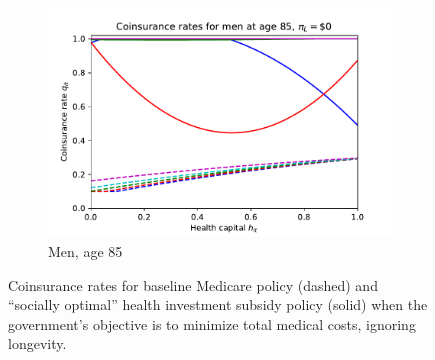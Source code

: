 \documentclass[12pt,pdftex,letterpaper]{article}
\begin{document}
\begin{figure}[h!]
\begin{subfigure}[b]{0.49\textwidth}
        \includegraphics[width=\textwidth]{../Figures/SocOpt00CopayMen85.pdf}
        \caption{Men, age 85}
    \end{subfigure}
    \caption{Coinsurance rates for baseline Medicare policy (dashed) and ``socially optimal'' health investment subsidy policy (solid) when the government's objective is to minimize total medical costs, ignoring longevity.}
    \label{fig:SocOpt00Copay}
\end{figure}


\clearpage
\end{document}
